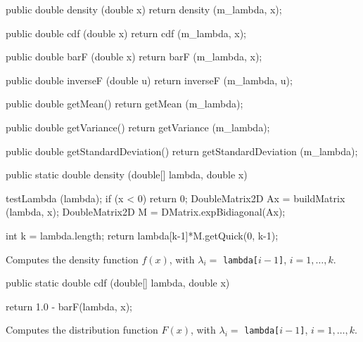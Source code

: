 \begin{code}\begin{hide}

   public double density (double x) {
      return density (m_lambda, x);
   }

   public double cdf (double x) {
      return cdf (m_lambda, x);
   }

   public double barF (double x) {
      return barF (m_lambda, x);
   }

   public double inverseF (double u) {
      return inverseF (m_lambda, u);
   }

   public double getMean() {
      return getMean (m_lambda);
   }

   public double getVariance() {
      return getVariance (m_lambda);
   }

   public double getStandardDeviation() {
      return getStandardDeviation (m_lambda);
   }\end{hide}

   public static double density (double[] lambda, double x)\begin{hide} {
      testLambda (lambda);
      if (x < 0)
         return 0;
      DoubleMatrix2D Ax = buildMatrix (lambda, x);
	   DoubleMatrix2D M = DMatrix.expBidiagonal(Ax);

      int k = lambda.length;
      return lambda[k-1]*M.getQuick(0, k-1);
   }\end{hide}
\end{code}
\begin{tabb} Computes the density function $f(x)$, with $\lambda_i = $
\texttt{lambda[$i-1$]}, $i = 1,\ldots,k$.
\end{tabb}
\begin{htmlonly}
\end{htmlonly}
\begin{code}

   public static double cdf (double[] lambda, double x)\begin{hide} {
      return 1.0 - barF(lambda, x);
   }\end{hide}
\end{code}
 \begin{tabb}
  Computes the  distribution function $F(x)$, with $\lambda_i = $
\texttt{lambda[$i-1$]}, $i = 1,\ldots,k$.
 \end{tabb}
\begin{htmlonly}
\end{htmlonly}
